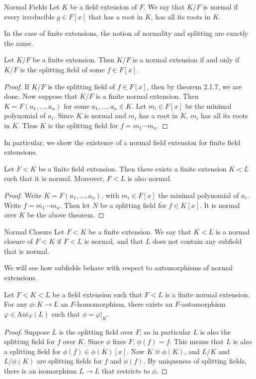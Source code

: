 \documentclass[a4paper]{article}
\begin{document}
\begin{defn}{Normal Fields}{} Let $K$ be a field extension of $F$. We say that $K/F$ is normal if every irreducible $g\in F[x]$ that has a root in $K$, has all its roots in $K$. 
\end{defn}

In the case of finite extensions, the notion of normality and splitting are exactly the same. 

\begin{lmm}{}{} Let $K/F$ be a finite extension. Then $K/F$ is a normal extension if and only if $K/F$ is the splitting field of some $f\in F[x]$. 
\begin{proof}
If $K/F$ is the splitting field of $f\in F[x]$, then by theorem 2.1.7, we are done. Now suppose that $K/F$ is a finite normal extension. Then $K=F(a_1,\dots,a_n)$ for some $a_1,\dots,a_n\in K$. Let $m_i\in F[x]$ be the minimal polynomial of $a_i$. Since $K$ is normal and $m_i$ has a root in $K$, $m_i$ has all its roots in $K$. Thus $K$ is the splitting field for $f=m_1\cdots m_n$. 
\end{proof}
\end{lmm}

In particular, we show the existence of a normal field extension for finite field extensions. 

\begin{crl}{}{} Let $F<K$ be a finite field extension. Then there exists a finite extension $K<L$ such that it is normal. Moreover, $F<L$ is also normal. 
\begin{proof}
Write $K=F(a_1,\dots,a_n)$, with $m_i\in F[x]$ the minimal polynomial of $a_i$. Write $f=m_1\cdots m_n$. Then let $N$ be a splitting field for $f\in K[x]$. It is normal over $K$ be the above theorem. 
\end{proof}
\end{crl}

\begin{defn}{Normal Closure}{} Let $F<K$ be a finite extension. We say that $K<L$ is a normal closure of $F<K$ if $F<L$ is normal, and that $L$ does not contain any subfield that is normal. 
\end{defn}

We will see how subfields behave with respect to automorphisms of normal extensions. 

\begin{crl}{}{} Let $F<K<L$ be a field extension such that $F<L$ is a finite normal extension. For any $\phi:K\to L$ an $F$-homomorphism, there exists an $F$-automorphism $\varphi\in\text{Aut}_F(L)$ such that $\phi=\varphi|_K$. 
\begin{proof}
Suppose $L$ is the splitting field over $F$, so in particular $L$ is also the splitting field for $f$ over $K$. Since $\phi$ fixes $F$, $\phi(f)=f$. This means that $L$ is also a splitting field for $\phi(f)\in\phi(K)[x]$. Now $K\cong\phi(K)$, and $L/K$  and $L/\phi(K)$ are splitting fields for $f$ and $\phi(f)$. By uniqueness of splitting fields, there is an isomorphism $L\to L$ that restricts to $\phi$. 
\end{proof}
\end{crl}
\end{document}
